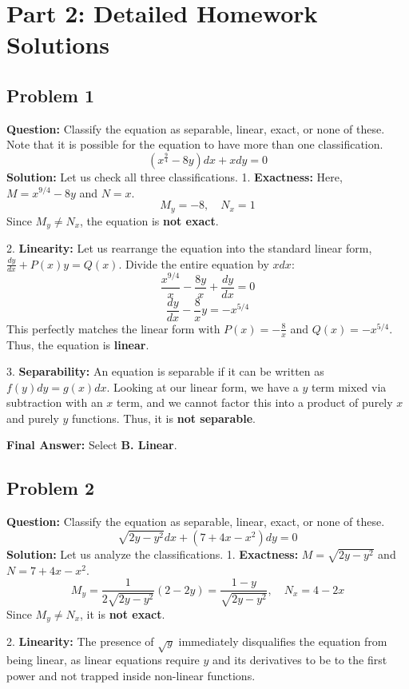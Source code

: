 \documentclass[11pt]{article}
\begin{document}
\newpage
\section{Part 2: Detailed Homework Solutions}

\subsection*{Problem 1}
\textbf{Question:} Classify the equation as separable, linear, exact, or none of these. Note that it is possible for the equation to have more than one classification.
\[ \left(x^{\frac{9}{4}} - 8y\right) dx + x dy = 0 \]
\textbf{Solution:} Let us check all three classifications.
1. \textbf{Exactness:} 
Here, $M = x^{9/4} - 8y$ and $N = x$.
\[ M_y = -8, \quad N_x = 1 \]
Since $M_y \neq N_x$, the equation is \textbf{not exact}.

2. \textbf{Linearity:}
Let us rearrange the equation into the standard linear form, $\frac{dy}{dx} + P(x)y = Q(x)$.
Divide the entire equation by $x dx$:
\[ \frac{x^{9/4}}{x} - \frac{8y}{x} + \frac{dy}{dx} = 0 \]
\[ \frac{dy}{dx} - \frac{8}{x}y = -x^{5/4} \]
This perfectly matches the linear form with $P(x) = -\frac{8}{x}$ and $Q(x) = -x^{5/4}$. Thus, the equation is \textbf{linear}.

3. \textbf{Separability:}
An equation is separable if it can be written as $f(y) dy = g(x) dx$. Looking at our linear form, we have a $y$ term mixed via subtraction with an $x$ term, and we cannot factor this into a product of purely $x$ and purely $y$ functions. Thus, it is \textbf{not separable}.

\textbf{Final Answer:} Select \textbf{B. Linear}.

\vspace{0.5cm}
\subsection*{Problem 2}
\textbf{Question:} Classify the equation as separable, linear, exact, or none of these. 
\[ \sqrt{2y - y^2} dx + \left(7 + 4x - x^2\right) dy = 0 \]
\textbf{Solution:} Let us analyze the classifications.
1. \textbf{Exactness:}
$M = \sqrt{2y - y^2}$ and $N = 7 + 4x - x^2$.
\[ M_y = \frac{1}{2\sqrt{2y-y^2}}(2 - 2y) = \frac{1-y}{\sqrt{2y-y^2}}, \quad N_x = 4 - 2x \]
Since $M_y \neq N_x$, it is \textbf{not exact}.

2. \textbf{Linearity:}
The presence of $\sqrt{y}$ immediately disqualifies the equation from being linear, as linear equations require $y$ and its derivatives to be to the first power and not trapped inside non-linear functions.
\end{document}
